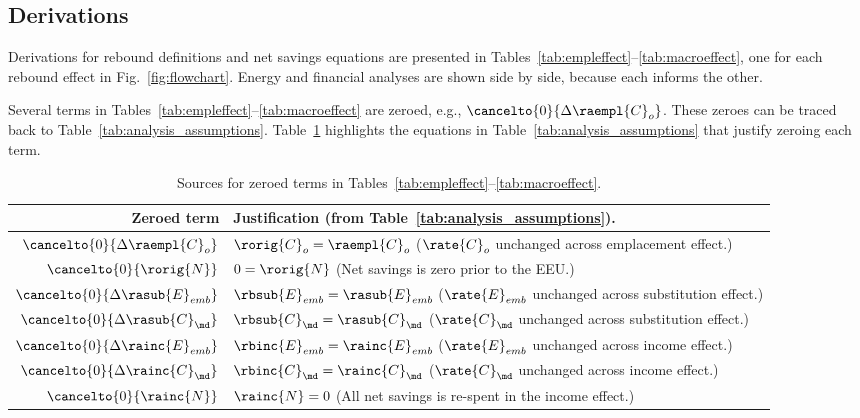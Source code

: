 


\subsection{Derivations}
\label{sec:derivations}

Derivations for rebound definitions and net savings equations
are presented in Tables~\ref{tab:empleffect}--\ref{tab:macroeffect},
one for each rebound effect in Fig.~\ref{fig:flowchart}.
Energy and financial analyses are shown side by side, because
each informs the other.

Several terms in Tables~\ref{tab:empleffect}--\ref{tab:macroeffect}
are zeroed, e.g., $\cancelto{0}{\Delta \raempl{C}_o}$. 
These zeroes can be traced back to Table~\ref{tab:analysis_assumptions}.
Table~\ref{tab:zeroed_terms} highlights the equations
in Table~\ref{tab:analysis_assumptions}
that justify zeroing each term.

\begin{table}
\centering %
\caption{Sources for zeroed terms in Tables~\ref{tab:empleffect}--\ref{tab:macroeffect}.}
\begin{tabular}{r l}
  \toprule
  Zeroed term & Justification (from Table~\ref{tab:analysis_assumptions}). \\
  \midrule
  $\cancelto{0}{\Delta \raempl{C}_o}$    & $\rorig{C}_o = \raempl{C}_o$ ($\rate{C}_o$ unchanged across emplacement effect.) \\
  $\cancelto{0}{\rorig{N}}$              & $0 = \rorig{N}$ (Net savings is zero prior to the EEU.) \\
  $\cancelto{0}{\Delta \rasub{E}_{emb}}$ & $\rbsub{E}_{emb} = \rasub{E}_{emb}$ ($\rate{E}_{emb}$ unchanged across substitution effect.) \\
  $\cancelto{0}{\Delta \rasub{C}_{\md}}$ & $\rbsub{C}_{\md} = \rasub{C}_{\md}$ ($\rate{C}_{\md}$ unchanged across substitution effect.) \\
  $\cancelto{0}{\Delta \rainc{E}_{emb}}$ & $\rbinc{E}_{emb} = \rainc{E}_{emb}$ ($\rate{E}_{emb}$ unchanged across income effect.) \\
  $\cancelto{0}{\Delta \rainc{C}_{\md}}$ & $\rbinc{C}_{\md} = \rainc{C}_{\md}$ ($\rate{C}_{\md}$ unchanged across income effect.) \\
  $\cancelto{0}{\rainc{N}}$              & $\rainc{N} = 0$ (All net savings is re-spent in the income effect.) \\
  \bottomrule
\end{tabular}
\label{tab:zeroed_terms}
\end{table}



